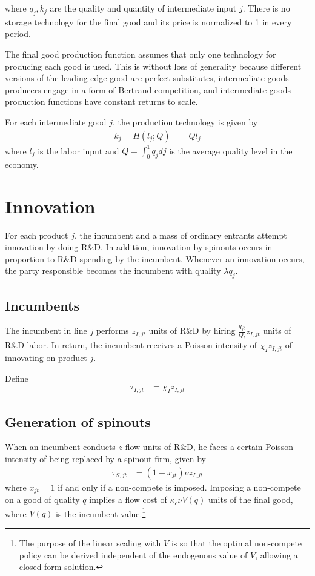 \documentclass[12pt,english]{article}
\theoremstyle{remark}
\begin{document}
where $q_j,k_j$ are the quality and quantity of intermediate input $j$. 
There is no storage technology for the final good and its price is normalized to 1 in every period. 

The final good production function assumes that only one technology for producing each good is used. This is without loss of generality because different versions of the leading edge good are perfect substitutes, intermediate goods producers engage in a form of Bertrand competition, and intermediate goods production functions have constant returns to scale. 

For each intermediate good $j$, the production technology is given by
\begin{align*}
k_j = H(l_j;Q) &= Q l_j
\end{align*}
where $l_j$ is the labor input and $Q = \int_0^1 q_j dj$ is the average quality level in the economy. 

\section{Innovation}

For each product $j$, the incumbent and a mass of ordinary entrants attempt innovation by doing R\&D. In addition, innovation by spinouts occurs in proportion to R\&D spending by the incumbent. Whenever an innovation occurs, the party responsible becomes the incumbent with quality $\lambda q_j$. 

\subsection{Incumbents}

The incumbent in line $j$ performs $z_{I,jt}$ units of R\&D by hiring $\frac{q_{jt}}{Q_t}z_{I,jt}$ units of R\&D labor. In return, the incumbent receives a Poisson intensity of $\chi_I z_{I,jt}$ of innovating on product $j$. 

Define
\begin{align}
	\tau_{I,jt} &= \chi_I z_{I,jt}
\end{align}


\subsection{Generation of spinouts}

When an incumbent conducts $z$ flow units of R\&D, he faces a certain Poisson intensity of being replaced by a spinout firm, given by 
\begin{align*}
	\tau_{S,jt} &= (1-x_{jt}) \nu z_{I,jt}
\end{align*} 
where $x_{jt} = 1$ if and only if a non-compete is imposed. Imposing a non-compete on a good of quality $q$ implies a flow cost of $\kappa_{c} \nu V(q)$ units of the final good, where $V(q)$ is the incumbent value.\footnote{The purpose of the linear scaling with $V$ is so that the optimal non-compete policy can be derived independent of the endogenous value of $V$, allowing a closed-form solution.}
\end{document}
